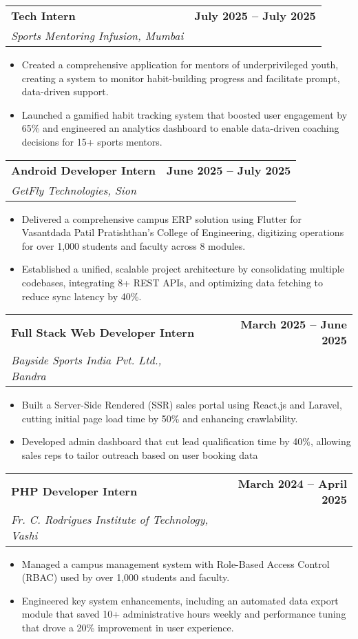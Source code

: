 \documentclass[11pt,a4paper]{article}
\makeatletter
\newcommand{\resumeItem}[1]{\item\small{#1}}
\newcommand{\resumeSubheading}[4]{
  \vspace{-1pt}
  \begin{tabular*}{\textwidth}[t]{l@{\extracolsep{\fill}}r}
    \textbf{#1} & \textcolor{light}{\small\textbf{#2}} \\
    \textit{\small#3} & \textcolor{light}{\small#4} \\
  \end{tabular*}\vspace{-5pt}
}
\makeatother
\begin{document}
\vspace{0.1em}

\resumeSubheading
{Tech Intern}{July 2025 -- July 2025}
{Sports Mentoring Infusion, Mumbai}{}
\begin{itemize}
    \resumeItem{Created a comprehensive application for mentors of underprivileged youth, creating a system to monitor habit-building progress and facilitate prompt, data-driven support.}
    \resumeItem{Launched a gamified habit tracking system that boosted user engagement by 65\% and engineered an analytics dashboard to enable data-driven coaching decisions for 15+ sports mentors.}
    
\end{itemize}

\vspace{0.1em}

\resumeSubheading
{Android Developer Intern}{June 2025 -- July 2025}
{GetFly Technologies, Sion}{}
\begin{itemize}
    \resumeItem{Delivered a comprehensive campus ERP solution using Flutter for Vasantdada Patil Pratishthan's College of Engineering, digitizing operations for over 1,000 students and faculty across 8 modules.}
\resumeItem{Established a unified, scalable project architecture by consolidating multiple codebases, integrating 8+ REST APIs, and optimizing data fetching to reduce sync latency by 40\%.}


\end{itemize}

\vspace{0.1em}

\resumeSubheading
{Full Stack Web Developer Intern}{March 2025 -- June 2025}
{Bayside Sports India Pvt. Ltd., Bandra}{}
\begin{itemize}
    \resumeItem{Built a Server-Side Rendered (SSR) sales portal using React.js and Laravel, cutting initial page load time by 50\% and enhancing crawlability.}
    \resumeItem{Developed admin dashboard that cut lead qualification time by 40\%, allowing sales reps to tailor outreach based on user booking data}
\end{itemize}

\vspace{0.1em}

\resumeSubheading
{PHP Developer Intern}{March 2024 -- April 2025}  
{Fr. C. Rodrigues Institute of Technology, Vashi}{}
\begin{itemize}
    \resumeItem{Managed a campus management system with Role-Based Access Control (RBAC) used by over 1,000 students and faculty.}
    \resumeItem{Engineered key system enhancements, including an automated data export module that saved 10+ administrative hours weekly and performance tuning that drove a 20\% improvement in user experience.}
\end{itemize}
\end{document}
